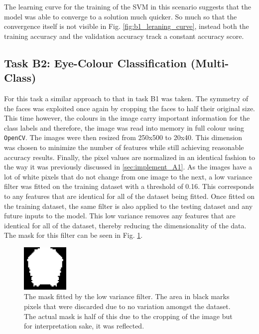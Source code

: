 \documentclass{article}
\begin{document}
	    The learning curve for the training of the SVM in this scenario suggests that the model was able to converge to a solution much quicker. So much so that the convergence itself is not visible in Fig. \ref{fig:b1_leraning_curve}, instead both the training accuracy and the validation accuracy track a constant accuracy score.
	    
    \subsection{Task B2: Eye-Colour Classification (Multi-Class)}
    \label{sec:implement_B2}
	    
	    For this task a similar approach to that in task B1 was taken. The symmetry of the faces was exploited once again by cropping the faces to half their original size. This time however, the colours in the image carry important information for the class labels and therefore, the image was read into memory in full colour using {\tt OpenCV}. The images were then resized from 250x500 to 20x40. This dimension was chosen to minimize the number of features while still achieving reasonable accuracy results. Finally, the pixel values are normalized in an identical fashion to the way it was previously discussed in \ref{sec:implement_A1}. As the images have a lot of white pixels that do not change from one image to the next, a low variance filter was fitted on the training dataset with a threshold of 0.16. This corresponds to any features that are identical for all of the dataset being fitted. Once fitted on the training dataset, the same filter is also applied to the testing dataset and any future inputs to the model. This low variance removes any features that are identical for all of the dataset, thereby reducing the dimensionality of the data. The mask for this filter can be seen in Fig. \ref{fig:lv_mask}.
	    \\
	    
	    \begin{figure}[htb]
	    	\centering
	    	\includegraphics[width=0.2\textwidth]{lv_mask.png}
	    	\caption{The mask fitted by the low variance filter. The area in black marks pixels that were discarded due to no variation amongst the dataset. The actual mask is half of this due to the cropping of the image but for interpretation sake, it was reflected.}
	    	\label{fig:lv_mask}
	    \end{figure}
	    
\end{document}
